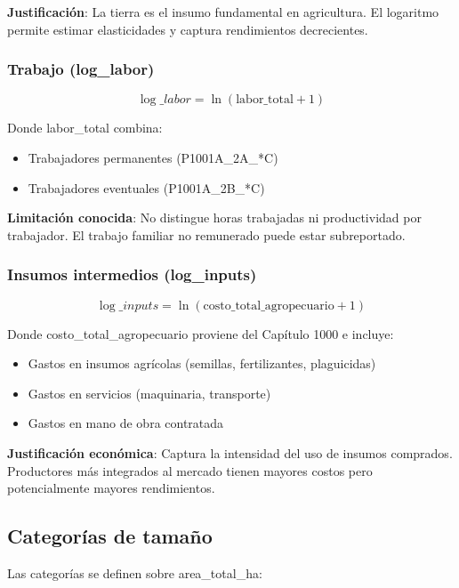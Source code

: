 \documentclass[11pt,a4paper]{article}
\begin{document}
\textbf{Justificación}: La tierra es el insumo fundamental en agricultura. El logaritmo permite estimar elasticidades y captura rendimientos decrecientes.

\subsubsection{Trabajo (log\_labor)}
\[
\log\_labor = \ln(\text{labor\_total} + 1)
\]

Donde labor\_total combina:
\begin{itemize}
    \item Trabajadores permanentes (P1001A\_2A\_*C)
    \item Trabajadores eventuales (P1001A\_2B\_*C)
\end{itemize}

\textbf{Limitación conocida}: No distingue horas trabajadas ni productividad por trabajador. El trabajo familiar no remunerado puede estar subreportado.

\subsubsection{Insumos intermedios (log\_inputs)}
\[
\log\_inputs = \ln(\text{costo\_total\_agropecuario} + 1)
\]

Donde costo\_total\_agropecuario proviene del Capítulo 1000 e incluye:
\begin{itemize}
    \item Gastos en insumos agrícolas (semillas, fertilizantes, plaguicidas)
    \item Gastos en servicios (maquinaria, transporte)
    \item Gastos en mano de obra contratada
\end{itemize}

\textbf{Justificación económica}: Captura la intensidad del uso de insumos comprados. Productores más integrados al mercado tienen mayores costos pero potencialmente mayores rendimientos.

\subsection{Categorías de tamaño}

Las categorías se definen sobre area\_total\_ha:
\end{document}
